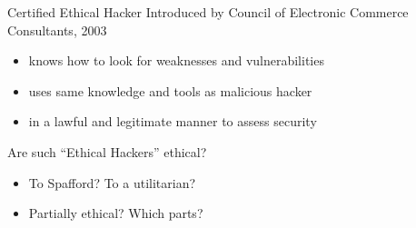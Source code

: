 \documentclass{beamer}
\begin{document}
\begin{frame}{Certified Ethical Hacker}
Introduced by Council of Electronic Commerce Consultants, 2003
\begin{itemize}
\item knows how to look for weaknesses and vulnerabilities
\item uses same knowledge and tools as malicious hacker
\item in a lawful and legitimate manner to assess security
\end{itemize}
\bigskip
Are such ``Ethical Hackers'' ethical?
\begin{itemize}
\item To Spafford? To a utilitarian?
\item Partially ethical? Which parts?
\end{itemize}
\end{frame}
\end{document}

